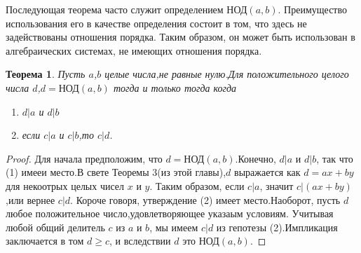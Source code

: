\documentclass[11pt]{article}
\newtheorem{theorem}{Теорема}
\begin{document}
Последующая теорема часто служит определением $\text{НОД}(a,b)$. Преимущество использования его в качестве определения состоит в том, что здесь не задействованы отношения порядка. Таким образом, он может быть использован в алгебраических системах, не имеющих отношения порядка. 

\begin{theorem}
	Пусть $a$,$b$ целые числа,не равные нулю.Для положительного целого числа $d$,$d=\text{НОД}(a,b)$ тогда и только тогда когда
\begin{enumerate}
    \item[(1)] $d|a$ и $d|b$
	\item[(2)] если $c|a$ и $c|b$,то $c|d$.
\end{enumerate}
\end{theorem}
\begin{proof}
	Для начала предположим, что $d=\text{НОД}(a,b)$.Конечно, $d|a$ и $d|b$, так что (1) имееи место.В свете Теоремы 3(из этой главы),$d$ выражается как $d=ax+by$ для некоотрых целых чисел $x$ и $y$.
	Таким образом, если $c|a$, значит $c|(ax+by)$,или вернее $c|d$.
	Короче говоря, утверждение (2) имеет место.Наоборот, пусть $d$ любое положительное число,удовлетворяющее указаым условиям.
	Учитывая любой общий делитель $c$ из $a$ и $b$, мы имеем $c|d$ из гепотезы (2).Импликация заключается в том $d \ge c$, и вследствии $d$ это $\text{НОД}(a,b)$.
\end{proof}
\end{document}
